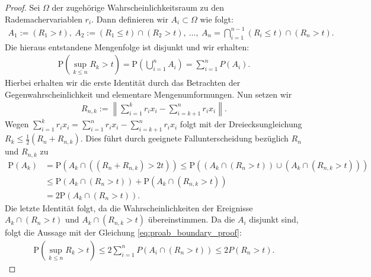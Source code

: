 \begin{proof}
	Sei $ \Omega $ der zugehörige Wahrscheinlichkeitsraum zu den Rademachervariablen $ r_i $.
	Dann definieren wir $ A_i \subset \Omega  $ wie folgt:
	\begin{align*}
		A_1 := (R_1 > t), \ 
		A_2 := (R_1 \leq t) \cap (R_2 > t), \
	\dots, \
		A_n = \bigcap \limits_{i = 1}^{n-1}(R_i \leq t) \cap (R_n > t).
	\end{align*}
	Die hieraus entstandene Mengenfolge ist disjunkt und wir erhalten:
	\begin{align}\label{eq:proab_boundary_proof}
		\mathrm{P}
		\left( 
		\sup \limits_{k \leq n} R_k > t
		\right)
		=
		\mathrm{P}
		\left( \bigcup \limits_{i = 1}^n A_i \right)
		=
		\sum \limits_{i = 1}^n P(A_i).
	\end{align}
	Hierbei erhalten wir die erste Identität durch das Betrachten der Gegenwahrscheinlichkeit und elementare Mengenumformungen.
	Nun setzen wir 
	\begin{align*}
		R_{n,k} := 
		\left\|
		\sum \limits_{i = 1}^k r_i x_i
		-
		\sum \limits_{i = k+1}^n r_i x_i
		\right\|.
	\end{align*}
	Wegen $ \sum_{i = 1}^k r_i x_i = \sum_{i = 1}^n  r_i x_i -\sum_{i = k+1}^n r_i x_i  $ 
	folgt mit der Dreiecksungleichung\\ $ R_k \leq \frac{1}{2} ( R_n + R_{n,k}) $.
	Dies führt durch geeignete Fallunterscheidung bezüglich $ R_n $ und $ R_{n,k} $ zu
	\begin{align*}
		\mathrm{P}(A_k)
		&=
		\mathrm{P}(A_k \cap ((R_n + R_{n,k}) > 2t))
		\leq
		\mathrm{P}((A_k \cap (R_n > t)) \cup (A_k \cap (R_{n,k} > t)) )\\
		&\leq 
		\mathrm{P}(A_k \cap (R_n > t)) + \mathrm{P}(A_k \cap (R_{n,k} > t ))\\
		&= 
		2 	\mathrm{P}(A_k \cap (R_n > t)).
	\end{align*}
	Die letzte Identität folgt, da die Wahrscheinlichkeiten der Ereignisse $ A_k \cap (R_n > t) $ und $ A_k \cap (R_{n,k} > t ) $ übereinstimmen.
	Da die $ A_i $ disjunkt sind, folgt die Aussage mit der Gleichung \eqref{eq:proab_boundary_proof}:
	\begin{align*}
		\mathrm{P}
		\left( 
		\sup \limits_{k \leq n} R_k > t
		\right)
		\leq
		2
		\sum \limits_{i = 1}^n P(A_i \cap (R_n > t))
		\leq 
		2 
		P(R_n > t).
	\end{align*}


\end{proof}

